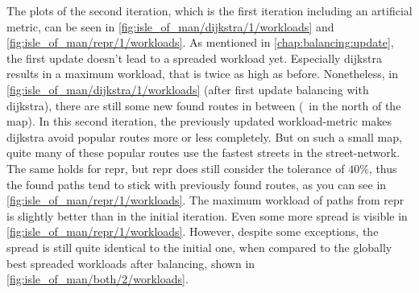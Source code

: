         The plots of the second iteration, which is the first iteration including an artificial \gls{metric}, can be seen in \cref{fig:isle_of_man/dijkstra/1/workloads} and \vref{fig:isle_of_man/repr/1/workloads}.
        As mentioned in \cref{chap:balancing:update}, the first update doesn't lead to a spreaded workload yet.
        Especially \gls{dijkstra} results in a maximum workload, that is twice as high as before.
        Nonetheless, in \cref{fig:isle_of_man/dijkstra/1/workloads} (after first update \gls{balancing} with \gls{dijkstra}), there are still some new found routes in between (\eg\ in the north of the map).
        In this second iteration, the previously updated workload-\gls{metric} makes \gls{dijkstra} avoid popular routes more or less completely.
        But on such a small map, quite many of these popular routes use the fastest streets in the street-network.
        The same holds for \gls{repr}, but \gls{repr} does still consider the tolerance of $\si{40 \percent}$, thus the found paths tend to stick with previously found routes, as you can see in \cref{fig:isle_of_man/repr/1/workloads}.
        The maximum workload of paths from \gls{repr} is slightly better than in the initial iteration.
        Even some more spread is visible in \cref{fig:isle_of_man/repr/1/workloads}.
        However, despite some exceptions, the spread is still quite identical to the initial one, when compared to the globally best spreaded workloads after \gls{balancing}, shown in \vref{fig:isle_of_man/both/2/workloads}.

